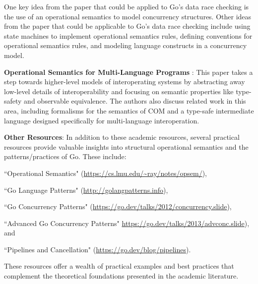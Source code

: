 \documentclass[12pt]{article}
\begin{document}
One key idea from the paper that could be applied to Go's data race checking is the use of an operational semantics to model concurrency structures. Other ideas from the paper that could be applicable to Go's data race checking include using state machines to implement operational semantics rules, defining conventions for operational semantics rules, and modeling language constructs in a concurrency model.


\textbf{Operational Semantics for Multi-Language Programs} \cite{operational-semantics-for-multi-language}: This paper takes a step towards higher-level models of interoperating systems by abstracting away low-level details of interoperability and focusing on semantic properties like type-safety and observable equivalence. The authors also discuss related work in this area, including formalisms for the semantics of COM and a type-safe intermediate language designed specifically for multi-language interoperation.


\textbf{Other Resources}:
In addition to these academic resources, several practical resources provide valuable insights into structural operational semantics and the patterns/practices of Go. These include:
\begin{enumerate*}
\item ``Operational Semantics" (\url{https://cs.lmu.edu/~ray/notes/opsem/}),
\item ``Go Language Patterns" (\url{http://golangpatterns.info}),
\item ``Go Concurrency Patterns" (\url{https://go.dev/talks/2012/concurrency.slide}),
\item ``Advanced Go Concurrency Patterns" \url{https://go.dev/talks/2013/advconc.slide}), and
\item ``Pipelines and Cancellation" (\url{https://go.dev/blog/pipelines}).
\end{enumerate*}
These resources offer a wealth of practical examples and best practices that complement the theoretical foundations presented in the academic literature.
\end{document}
